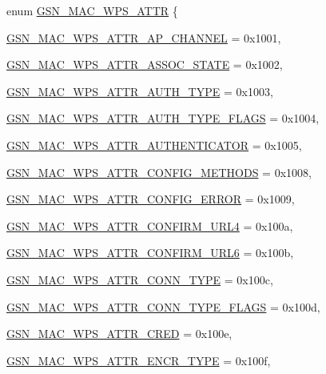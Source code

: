 \begin{DoxyCompactItemize}
enum \hyperlink{a00642_ga0ae19d69a0b381d883890df8a7812414}{GSN\_\-MAC\_\-WPS\_\-ATTR} \{ \par
\hyperlink{a00642_gga0ae19d69a0b381d883890df8a7812414ae0e4f98b1e9f93fab112823a40124cf9}{GSN\_\-MAC\_\-WPS\_\-ATTR\_\-AP\_\-CHANNEL} =  0x1001, 
\par
\hyperlink{a00642_gga0ae19d69a0b381d883890df8a7812414a14a9ece3989389a193ba8952c6e54a49}{GSN\_\-MAC\_\-WPS\_\-ATTR\_\-ASSOC\_\-STATE} =  0x1002, 
\par
\hyperlink{a00642_gga0ae19d69a0b381d883890df8a7812414a82abc540504b8e5abd3d3284d1be3691}{GSN\_\-MAC\_\-WPS\_\-ATTR\_\-AUTH\_\-TYPE} =  0x1003, 
\par
\hyperlink{a00642_gga0ae19d69a0b381d883890df8a7812414a82a50e93477f656efe36c78bee9853ae}{GSN\_\-MAC\_\-WPS\_\-ATTR\_\-AUTH\_\-TYPE\_\-FLAGS} =  0x1004, 
\par
\hyperlink{a00642_gga0ae19d69a0b381d883890df8a7812414a6db708b7b9456aa0954847a56a87c950}{GSN\_\-MAC\_\-WPS\_\-ATTR\_\-AUTHENTICATOR} =  0x1005, 
\par
\hyperlink{a00642_gga0ae19d69a0b381d883890df8a7812414a0b8df95e03afe854134675a191b32380}{GSN\_\-MAC\_\-WPS\_\-ATTR\_\-CONFIG\_\-METHODS} =  0x1008, 
\par
\hyperlink{a00642_gga0ae19d69a0b381d883890df8a7812414a11665e3ac538b48a4c5cd07c7f85ac34}{GSN\_\-MAC\_\-WPS\_\-ATTR\_\-CONFIG\_\-ERROR} =  0x1009, 
\par
\hyperlink{a00642_gga0ae19d69a0b381d883890df8a7812414a58e52e468a71edde980771bdcc5cb57c}{GSN\_\-MAC\_\-WPS\_\-ATTR\_\-CONFIRM\_\-URL4} =  0x100a, 
\par
\hyperlink{a00642_gga0ae19d69a0b381d883890df8a7812414a8196c29bf558c99d22a89a2821eeddd7}{GSN\_\-MAC\_\-WPS\_\-ATTR\_\-CONFIRM\_\-URL6} =  0x100b, 
\par
\hyperlink{a00642_gga0ae19d69a0b381d883890df8a7812414acde288264ac04d778a3253db30d27606}{GSN\_\-MAC\_\-WPS\_\-ATTR\_\-CONN\_\-TYPE} =  0x100c, 
\par
\hyperlink{a00642_gga0ae19d69a0b381d883890df8a7812414a860213d76ac7a737ae6526d4ede0972b}{GSN\_\-MAC\_\-WPS\_\-ATTR\_\-CONN\_\-TYPE\_\-FLAGS} =  0x100d, 
\par
\hyperlink{a00642_gga0ae19d69a0b381d883890df8a7812414af801b5a3d9b7781b514c52ff1d95046e}{GSN\_\-MAC\_\-WPS\_\-ATTR\_\-CRED} =  0x100e, 
\par
\hyperlink{a00642_gga0ae19d69a0b381d883890df8a7812414a0f7ef631b9b5172cdeaac0f6d57be68b}{GSN\_\-MAC\_\-WPS\_\-ATTR\_\-ENCR\_\-TYPE} =  0x100f, 
\par

\end{DoxyCompactItemize}
